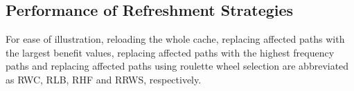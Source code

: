 
\subsection{Performance of Refreshment Strategies}
\label{ssec:overhead-strategy}
For ease of illustration, reloading the whole cache, replacing affected paths with the largest benefit values, replacing affected paths with the highest frequency paths and replacing affected paths using roulette wheel selection are abbreviated as RWC, RLB, RHF and RRWS, respectively.

